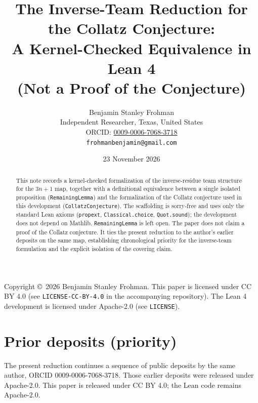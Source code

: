 \documentclass[11pt]{article}
\title{The Inverse-Team Reduction for the Collatz Conjecture:\\
A Kernel-Checked Equivalence in Lean 4\\
(Not a Proof of the Conjecture)}
\author{Benjamin Stanley Frohman\\
Independent Researcher, Texas, United States\\
ORCID: \href{https://orcid.org/0009-0006-7068-3718}{0009-0006-7068-3718}\\
\texttt{frohmanbenjamin@gmail.com}}
\date{23 November 2026}
\begin{document}
\maketitle

\begin{abstract}
This note records a kernel-checked formalization of the inverse-residue team structure for the $3n+1$ map, together with a definitional equivalence between a single isolated proposition (\texttt{RemainingLemma}) and the formalization of the Collatz conjecture used in this development (\texttt{CollatzConjecture}). The scaffolding is sorry-free and uses only the standard Lean axioms (\texttt{propext}, \texttt{Classical.choice}, \texttt{Quot.sound}); the development does not depend on Mathlib. \texttt{RemainingLemma} is left open. The paper does not claim a proof of the Collatz conjecture. It ties the present reduction to the author's earlier deposits on the same map, establishing chronological priority for the inverse-team formulation and the explicit isolation of the covering claim.
\end{abstract}

\noindent
Copyright \copyright\ 2026 Benjamin Stanley Frohman.
This paper is licensed under CC BY 4.0 (see \texttt{LICENSE-CC-BY-4.0} in the accompanying repository).
The Lean 4 development is licensed under Apache-2.0 (see \texttt{LICENSE}).

\section{Prior deposits (priority)}

The present reduction continues a sequence of public deposits by the same author, ORCID 0009-0006-7068-3718. Those earlier deposits were released under Apache-2.0. This paper is released under CC BY 4.0; the Lean code remains Apache-2.0.
\end{document}
